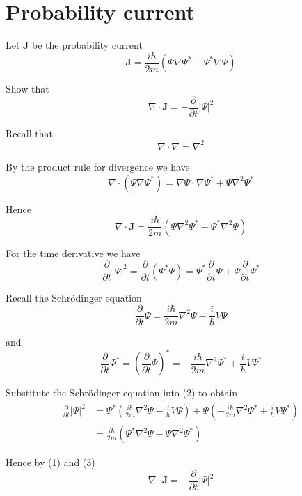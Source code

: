 

\section*{Probability current}

Let $\mathbf J$ be the probability current
\begin{equation*}
\mathbf J=\frac{i\hbar}{2m}\left(\Psi\nabla\Psi^*-\Psi^*\nabla\Psi\right)
\end{equation*}

Show that
\begin{equation*}
\nabla\cdot\mathbf J=-\frac{\partial}{\partial t}|\Psi|^2
\end{equation*}

Recall that
\begin{equation*}
\nabla\cdot\nabla=\nabla^2
\end{equation*}

By the product rule for divergence we have
\begin{equation*}
\nabla\cdot(\Psi\nabla\Psi^*)
=\nabla\Psi\cdot\nabla\Psi^*+\Psi\nabla^2\Psi^*
\end{equation*}

Hence
\begin{equation*}
\nabla\cdot\mathbf J
=\frac{i\hbar}{2m}\left(\Psi\nabla^2\Psi^*-\Psi^*\nabla^2\Psi\right)
\tag{1}
\end{equation*}

For the time derivative we have
\begin{equation*}
\frac{\partial}{\partial t}|\Psi|^2
=\frac{\partial}{\partial t}(\Psi^*\Psi)
=\Psi^*\frac{\partial}{\partial t}\Psi+\Psi\frac{\partial}{\partial t}\Psi^*
\tag{2}
\end{equation*}

Recall the Schr\"odinger equation
\begin{equation*}
\frac{\partial}{\partial t}\Psi
=\frac{i\hbar}{2m}\nabla^2\Psi-\frac{i}{\hbar}V\Psi
\end{equation*}

and
\begin{equation*}
\frac{\partial}{\partial t}\Psi^*=\left(\frac{\partial}{\partial t}\Psi\right)^*
=-\frac{i\hbar}{2m}\nabla^2\Psi^*+\frac{i}{\hbar}V\Psi^*
\end{equation*}

Substitute the Schr\"odinger equation into (2) to obtain
\begin{align*}
\frac{\partial}{\partial t}|\Psi|^2
&=\Psi^*\left(\frac{i\hbar}{2m}\nabla^2\Psi-\frac{i}{\hbar}V\Psi\right)
+\Psi\left(-\frac{i\hbar}{2m}\nabla^2\Psi^*+\frac{i}{\hbar}V\Psi^*\right)
\\
&=\frac{i\hbar}{2m}\left(\Psi^*\nabla^2\Psi-\Psi\nabla^2\Psi^*\right)
\tag{3}
\end{align*}

Hence by (1) and (3)
\begin{equation*}
\nabla\cdot\mathbf J=-\frac{\partial}{\partial t}|\Psi|^2
\tag{4}
\end{equation*}


